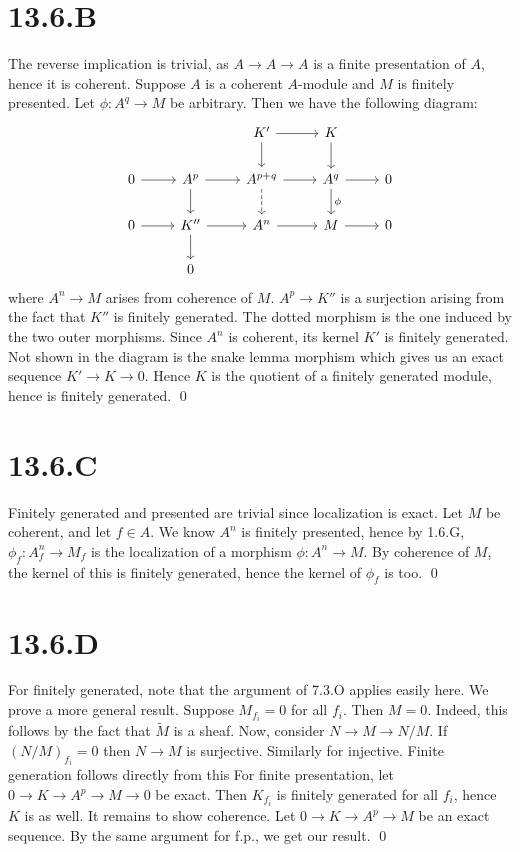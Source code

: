 \documentclass{article}
\begin{document}
\section{13.6.B}
The reverse implication is trivial, as $A \to A \to A$ is a finite
presentation of $A$, hence it is coherent. Suppose
$A$ is a coherent $A$-module and
$M$ is finitely presented. Let $\phi: A^q \to M$ be
arbitrary. Then we have the following diagram: \[\begin{tikzcd}
          &         & {K'}      & K         \\
        0 & {A^{p}} & {A^{p+q}} & {A^q} & 0 \\
        0 & {K''}   & {A^n}     & M     & 0 \\
          & 0
        \arrow[from=3-1, to=3-2]
        \arrow[from=3-2, to=3-3]
        \arrow[from=3-3, to=3-4]
        \arrow[from=3-4, to=3-5]
        \arrow["\phi", from=2-4, to=3-4]
        \arrow[from=2-4, to=2-5]
        \arrow[dashed, from=2-3, to=3-3]
        \arrow[from=2-3, to=2-4]
        \arrow[from=2-2, to=2-3]
        \arrow[from=2-2, to=3-2]
        \arrow[from=2-1, to=2-2]
        \arrow[from=1-3, to=1-4]
        \arrow[from=1-3, to=2-3]
        \arrow[from=3-2, to=4-2]
        \arrow[from=1-4, to=2-4]
    \end{tikzcd}\] where
$A^n \to M$ arises from coherence of $M$.
$A^p \to K''$ is a surjection arising from the fact that
$K''$ is finitely generated. The dotted morphism is the one
induced by the two outer morphisms. Since $A^n$ is coherent,
its kernel $K'$ is finitely generated. Not shown in the
diagram is the snake lemma morphism which gives us an exact sequence
$K' \to K \to 0$. Hence $K$ is the quotient of a
finitely generated module, hence is finitely generated. \qed

\section{13.6.C}
Finitely generated and presented are trivial since localization is exact. Let
$M$ be coherent, and let $f \in A$. We know
$A^n$ is finitely presented, hence by 1.6.G,
$\phi_f: A_f^n \to M_f$ is the localization of a morphism
$\phi: A^n \to M$. By coherence of $M$, the kernel of
this is finitely generated, hence the kernel of $\phi_f$ is too.
\qed

\section{13.6.D}
For finitely generated, note that the argument of 7.3.O applies easily here. We
prove a more general result. Suppose $M_{f_i}=0$ for all
$f_i$. Then $M = 0$. Indeed, this follows by
the fact that $\widetilde{M}$ is a sheaf. Now, consider
$N \to M \to N/M$. If $(N/M)_{f_i}=0$ then
$N \to M$ is surjective. Similarly for injective. Finite
generation follows directly from this For finite presentation, let
$0 \to K \to A^p \to M \to 0$ be exact. Then $K_{f_i}$ is finitely
generated for all $f_i$, hence $K$ is as
well. It remains to show coherence. Let $0 \to K \to A^p \to M$ be an exact
sequence. By the same argument for f.p., we get our result. \qed
\end{document}
